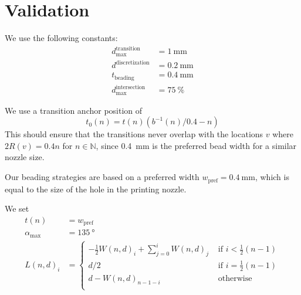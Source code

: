\section{Validation}
We use the following constants:
\begin{align}
d_\text{max}^\text{transition} &= \SI{1}{\milli\meter} \\
d^\text{discretization} &= \SI{0.2}{\milli\meter} \\
t_\text{beading} &= \SI{0.4}{\milli\meter} \\
d_\text{max}^\text{intersection} &= \SI{75}{\percent}
\end{align}

We use a transition anchor position of
$$t_0(n) =  t(n) \left( b^{-1}(n) / 0.4  - n \right)$$
This should ensure that the transitions never overlap with the locations $v$ where $2 R(v) = 0.4n$ for $n \in \mathbb{N}$, since \SI{0.4}{\milli\meter} is the preferred bead width for a similar nozzle size.

Our beading strategies are based on a preferred width $w_\text{pref} = \SI{0.4}{\milli\meter}$, which is equal to the size of the hole in the printing nozzle.

We set 
\begin{align*}
t(n) &= w_\text{pref} \\
\alpha_\text{max} &= \SI{135}{\degree} \\
L(n,d)_i &= 
\begin{cases}
-\frac12 W(n,d)_i + \sum_{j=0}^i W(n,d)_j & \text{ if } i < \frac12 (n -1) \\
d/2 & \text{ if } i =  \frac12 (n -1) \\
d - W(n,d)_{n-1-i} & \text{ otherwise }\\
\end{cases}
\end{align*}


